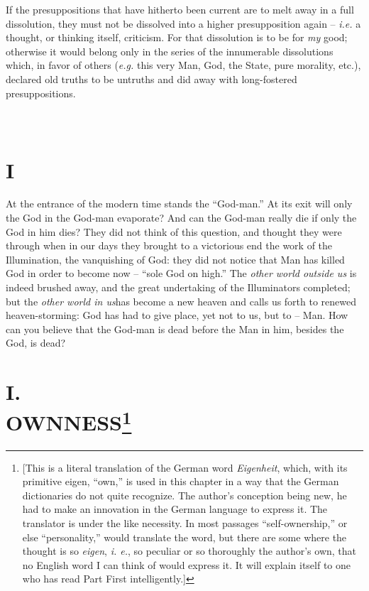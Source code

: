 \documentclass[12pt,a4paper]{book}
\begin{document}
If the presuppositions that have hitherto been current are to melt away in a 
full dissolution, they must not be dissolved into a higher presupposition 
again -- \textit{i.e.} a thought, or thinking itself, criticism. For that 
dissolution is to be for \textit{my} good; otherwise it would belong only in 
the series of the innumerable dissolutions which, in favor of others 
(\textit{e.g.} this very Man, God, the State, pure morality, etc.), declared 
old truths to be untruths and did away with long-fostered presuppositions.

\chapter[Part Second: I]{\\
I}

\medskip{}

\noindent{}At the entrance of the modern time stands the ``God-man.'' At its 
exit will only the God in the God-man evaporate? And can the God-man really 
die if only the God in him dies? They did not think of this question, and 
thought they were through when in our days they brought to a victorious end 
the work of the Illumination, the vanquishing of God: they did not notice that 
Man has killed God in order to become now -- ``sole God on high.'' The 
\textit{other world outside us} is indeed brushed away, and the great 
undertaking of the Illuminators completed; but the \textit{other world in 
us}has become a new heaven and calls us forth to renewed heaven-storming: God 
has had to give place, yet not to us, but to -- Man. How can you believe that 
the God-man is dead before the Man in him, besides the God, is dead?

\medskip{}

\chapter[I. Ownness]{\centering I.\\
OWNNESS\footnote{[This is a literal translation of the German word 
\textit{Eigenheit}, which, with its primitive eigen, ``own,'' is used in 
this chapter in a way that the German dictionaries do not quite recognize. The 
author's conception being new, he had to make an innovation in the German 
language to express it. The translator is under the like necessity. In most 
passages ``self-ownership,'' or else ``personality,'' would translate the 
word, but there are some where the thought is so \textit{eigen}, \textit{i. 
e.}, so peculiar or so thoroughly the author's own, that no English word I can 
think of would express it. It will explain itself to one who has read Part 
First intelligently.]}}
\end{document}
